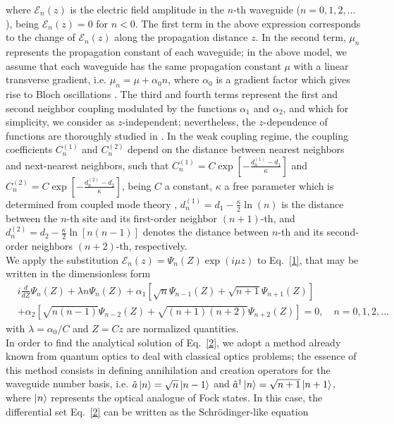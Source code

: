 \documentclass[12pt]{article}
\numberwithin{equation}{section}
\begin{document}
where $\mathcal{E}_{n}(z)$ is the electric field amplitude in the $n$-th waveguide ($n=0,1,2,...$), being $ \mathcal{E}_{n}(z)=0 $ for $n<0$. The first term in the above expression corresponds to the change of $ \mathcal{E}_{n}(z)$ along the propagation distance $z$. In the second term, $\mu_{n}$ represents the propagation constant of each waveguide; in the above model, we assume that each waveguide has the same propagation constant $\mu$ with a linear transverse gradient, i.e. $\mu_{n}=\mu + \alpha_{0} n$, where $\alpha_{0}$ is a gradient factor which gives rise to Bloch oscillations \cite{2.2A, 16A,18A,19A}. The third and fourth terms represent the first and second neighbor coupling modulated by the functions $\alpha_{1}$ and $\alpha_{2}$, and which for simplicity, we consider as $z$-independent; nevertheless, the $z$-dependence of functions are thoroughly studied in \cite{20}. In the weak coupling regime, the coupling coefficients $C_n^{(1)}$ and $C_n^{(2)}$ depend on the distance between nearest neighbors and next-nearest neighbors, such that $C^{(1)}_{n}=C \exp[-\frac{d^{(1)}_{n}-d_{1}}{\kappa}]$ and $C^{(2)}_{n}=C \exp[-\frac{d^{(2)}_{n}-d_{2}}{\kappa}]$, being $C$ a constant, $\kappa$ a free parameter which is determined from coupled mode theory \cite{21,21.5,22,23}, $d^{(1)}_{n}=d_{1}-\frac{\kappa}{2} \ln(n)$ is the distance between the $n$-th site and its first-order neighbor $(n+1)$-th, and $d^{(2)}_{n}=d_{2}-\frac{\kappa}{2} \ln[n \left(n-1\right)] $ denotes the distance between $n$-th and its second-order neighbors $(n+2)$-th, respectively.\\
We apply the substitution $\mathcal{E}_{n}(z)=\Psi_{n}\left(Z\right) \exp\left(i \mu z\right)$ to Eq.~\eqref{1},  that may be written in the dimensionless form
\begin{align} \label{2}
& i \frac{d}{dZ} \Psi_{n}(Z) + \lambda n  \Psi_{n}(Z) + \alpha_{1}\left[\sqrt{n} \Psi_{n-1}(Z) + \sqrt{n+1} \Psi_{n+1}(Z)\right]  
\nonumber\\ &
+ \alpha_{2}\left[\sqrt{n(n-1)} \Psi_{n-2}(Z) + \sqrt{(n+1)(n+2)} \Psi_{n+2}(Z)\right]=0, \quad n=0,1,2,...
\end{align}
with $\lambda=\alpha_{0}/C$ and $Z=C z$ are normalized quantities.\\
In order to find the analytical solution of Eq.~\eqref{2}, we adopt a method already known from  quantum optics to deal with classical optics problems; the essence of this method consists in defining annihilation and creation operators for the waveguide number basis, i.e. $\hat{a}\ket{n}=\sqrt{n}\ket{n-1}$ and $\hat{a}^{\dagger}\ket{n}=\sqrt{n+1}\ket{n+1}$, where $\ket{n}$ represents the optical analogue of Fock states. In this case, the differential set Eq.~\eqref{2} can be written as the Schrödinger-like equation 
\end{document}
